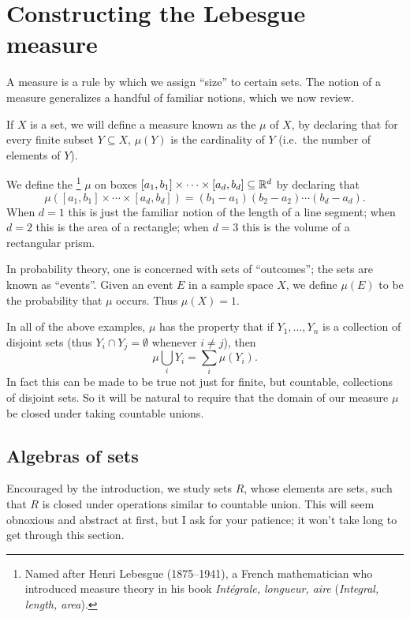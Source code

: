 \chapter{Constructing the Lebesgue measure}\label{ch:ch1}\label{measureChapter}
A measure is a rule by which we assign ``size'' to certain sets.
The notion of a measure generalizes a handful of familiar notions, which we now review.
\begin{example}\label{examples of measures}
If $X$ is a set, we will define a measure known as the  $\mu$ of $X$, by declaring that for every finite subset $Y \subseteq X$, $\mu(Y)$ is the cardinality of $Y$ (i.e.\ the number of elements of $Y$).

We define the \footnote{Named after Henri Lebesgue (1875--1941), a French mathematician who introduced measure theory in his book \emph{Intégrale, longueur, aire} (\emph{Integral, length, area}).}
$\mu$ on boxes $[a_{1}, b_{1}] \times \cdots \times [a_{d}, b_{d}] \subseteq \mathbb{R}^{d}$ by declaring that
\[\mu([a_{1}, b_{1}] \times \cdots \times [a_{d}, b_{d}]) = (b_{1} - a_{1})(b_{2} - a_{2})\cdots(b_{d} - a_{d}).\]
When $d = 1$ this is just the familiar notion of the length of a line segment; when $d = 2$ this is the area of a rectangle; when $d = 3$ this is the volume of a rectangular prism.

In probability theory, one is concerned with sets of ``outcomes''; the sets are known as ``events''. Given an event $E$ in a sample space $X$, we define $\mu(E)$ to be the probability that $\mu$ occurs. Thus $\mu(X) = 1$.
\end{example}

\begin{subsec}
In all of the above examples, $\mu$ has the property that if $Y_{1}, \dots, Y_{n}$ is a collection of disjoint sets (thus $Y_{i} \cap Y_{j} = \emptyset$ whenever $i \neq j$), then
\[\mu\bigcup_{i} Y_{i} = \sum_{i} \mu(Y_{i}).\]
In fact this can be made to be true not just for finite, but countable, collections of disjoint sets.
So it will be natural to require that the domain of our measure $\mu$ be closed under taking countable unions.
\end{subsec}

\section{Algebras of sets}
Encouraged by the introduction, we study sets $R$, whose elements are sets, such that $R$ is closed under operations similar to countable union.
This will seem obnoxious and abstract at first, but I ask for your patience; it won't take long to get through this section.

